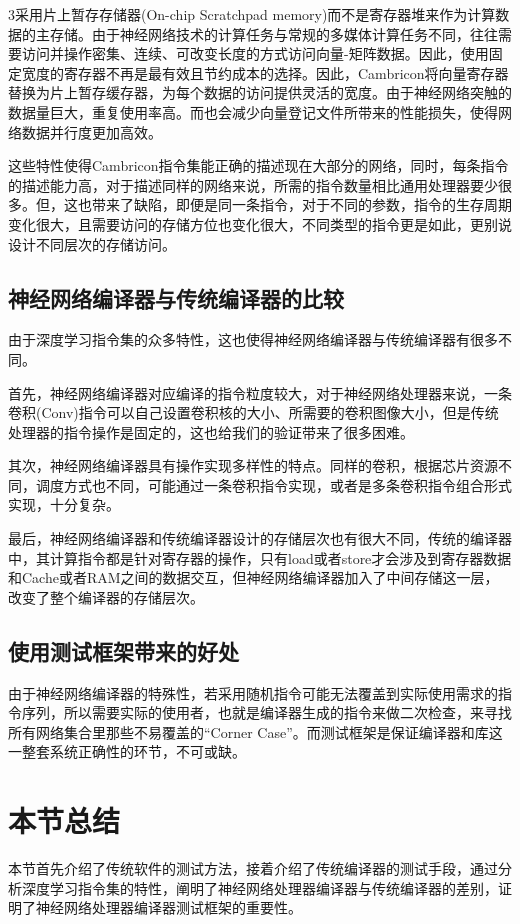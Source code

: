 3采用片上暂存存储器(On-chip Scratchpad memory)而不是寄存器堆来作为计算数据的主存储。由于神经网络技术的计算任务与常规的多媒体计算任务不同，往往需要访问并操作密集、连续、可改变长度的方式访问向量-矩阵数据。因此，使用固定宽度的寄存器不再是最有效且节约成本的选择。因此，Cambricon将向量寄存器替换为片上暂存缓存器，为每个数据的访问提供灵活的宽度。由于神经网络突触的数据量巨大，重复使用率高。而也会减少向量登记文件所带来的性能损失，使得网络数据并行度更加高效。

这些特性使得Cambricon指令集能正确的描述现在大部分的网络，同时，每条指令的描述能力高，对于描述同样的网络来说，所需的指令数量相比通用处理器要少很多。但，这也带来了缺陷，即便是同一条指令，对于不同的参数，指令的生存周期变化很大，且需要访问的存储方位也变化很大，不同类型的指令更是如此，更别说设计不同层次的存储访问。

\subsection{神经网络编译器与传统编译器的比较}
由于深度学习指令集的众多特性，这也使得神经网络编译器与传统编译器有很多不同。

首先，神经网络编译器对应编译的指令粒度较大，对于神经网络处理器来说，一条卷积(Conv)指令可以自己设置卷积核的大小、所需要的卷积图像大小，但是传统处理器的指令操作是固定的，这也给我们的验证带来了很多困难。

其次，神经网络编译器具有操作实现多样性的特点。同样的卷积，根据芯片资源不同，调度方式也不同，可能通过一条卷积指令实现，或者是多条卷积指令组合形式实现，十分复杂。

最后，神经网络编译器和传统编译器设计的存储层次也有很大不同，传统的编译器中，其计算指令都是针对寄存器的操作，只有load或者store才会涉及到寄存器数据和Cache或者RAM之间的数据交互，但神经网络编译器加入了中间存储这一层，改变了整个编译器的存储层次。

\subsection{使用测试框架带来的好处}
由于神经网络编译器的特殊性，若采用随机指令可能无法覆盖到实际使用需求的指令序列，所以需要实际的使用者，也就是编译器生成的指令来做二次检查，来寻找所有网络集合里那些不易覆盖的“Corner Case”。而测试框架是保证编译器和库这一整套系统正确性的环节，不可或缺。

\section{本节总结}
本节首先介绍了传统软件的测试方法，接着介绍了传统编译器的测试手段，通过分析深度学习指令集的特性，阐明了神经网络处理器编译器与传统编译器的差别，证明了神经网络处理器编译器测试框架的重要性。